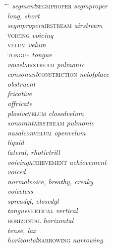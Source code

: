 \documentclass[output=paper]{langsci/langscibook}
\begin{document}
\begin{figure} 
\begin{exe}
\ex
\label{B2}
\begin{tabbing}
\hspace{1,5em}\=\hspace{1,5em}\=\hspace{1,5em}\=\hspace{1,5em}\=\hspace{6em}
\=\kill
\textit{segment}\>\>\>\>\>\textsc{segmproper} \textit{segmproper} \\
\>\textit{long,  short} \\
\textit{segmproper}\>\>\>\>\>\textsc{airstream} \textit{airstream} \\
\>\>\>\>\>\textsc{voicing} \textit{voicing} \\
\>\>\>\>\>\textsc{velum} \textit{velum} \\
\>\>\>\>\>\textsc{tongue} \textit{tongue} \\
\>\textit{vowel}\>\>\>\>\textsc{airstream} \textit{pulmonic} \\
\>\textit{consonant}\>\>\>\>\textsc{constriction} \textit{nelofplace} \\
\>\>\textit{obstruent} \\
\>\>\>\textit{fricative} \\
\>\>\>\textit{affricate} \\
\>\>\>\textit{plosive}\>\>\textsc{velum} \textit{closedvelum} \\
\>\>\textit{sonorant}\>\>\>\textsc{airstream} \textit{pulmonic} \\
\>\>\>\textit{nasalcon}\>\>\textsc{velum} \textit{openvelum} \\
\>\>\>\textit{liquid} \\
\>\>\>\>\textit{lateral, rhotictrill} \\
\textit{voicing}\>\>\>\>\>\textsc{achievement} \textit{achievement} \\
\>\textit{voiced} \\
\>\>\textit{normalvoice, breathy, creaky} \\
\>\textit{voiceless} \\
\>\>\textit{spreadgl, closedgl} \\
\textit{tongue}\>\>\>\>\>\textsc{vertical} \textit{vertical} \\
\>\>\>\>\>\textsc{horizontal} \textit{horizontal} \\
\>\textit{tense, lax} \\
\textit{horizontal}\>\>\>\>\>\textsc{narrowing} \textit{narrowing} \\

\end{tabbing}
\end{exe}
\end{figure}
\end{document}
